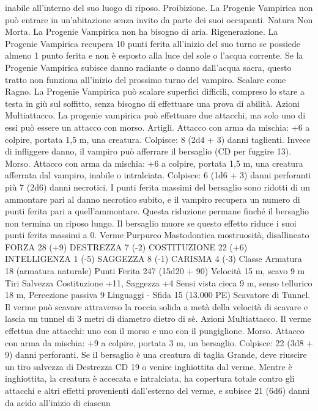 \begin{multicols}{2}
inabile all’interno del suo luogo di riposo.
Proibizione. La Progenie Vampirica non può entrare in
un’abitazione senza invito da parte dei suoi occupanti.
Natura Non Morta. La Progenie Vampirica non ha bisogno di
aria.
Rigenerazione. La Progenie Vampirica recupera 10 punti ferita
all’inizio del suo turno se possiede almeno 1 punto ferita e non è
esposto alla luce del sole o l’acqua corrente. Se la Progenie
Vampirica subisce danno radiante o danno dall’acqua sacra,
questo tratto non funziona all’inizio del prossimo turno del
vampiro.
Scalare come Ragno. La Progenie Vampirica può scalare
superfici difficili, compreso lo stare a testa in giù sul soffitto,
senza bisogno di effettuare una prova di abilità.
Azioni
Multiattacco. La progenie vampirica può effettuare due attacchi,
ma solo uno di essi può essere un attacco con morso.
Artigli. Attacco con arma da mischia: +6 a colpire, portata 1,5
m, una creatura.
Colpisce: 8 (2d4 + 3) danni taglienti. Invece di infliggere danno,
il vampiro può afferrare il bersaglio (CD per fuggire 13).
Morso. Attacco con arma da mischia: +6 a colpire, portata 1,5 m,
una creatura afferrata dal vampiro, inabile o intralciata.
Colpisce: 6 (1d6 + 3) danni perforanti più 7 (2d6) danni necrotici. I
punti ferita massimi del bersaglio sono ridotti di un ammontare pari
al danno necrotico subito, e il vampiro recupera un numero di punti
ferita pari a quell’ammontare. Questa riduzione permane finché il
bersaglio non termina un riposo lungo. Il bersaglio muore se questo
effetto riduce i suoi punti ferita massimi a 0.
Verme Purpureo
Mastodontica mostruosità, disallineato
FORZA 28 (+9)
DESTREZZA 7 (-2)
COSTITUZIONE 22 (+6)
INTELLIGENZA 1 (-5)
SAGGEZZA 8 (-1)
CARISMA 4 (-3)
Classe Armatura 18 (armatura naturale)
Punti Ferita 247 (15d20 + 90)
Velocità 15 m, scavo 9 m
Tiri Salvezza Costituzione +11, Saggezza +4
Sensi vista cieca 9 m, senso tellurico 18 m, Percezione passiva 9
Linguaggi -
Sfida 15 (13.000 PE)
Scavatore di Tunnel. Il verme può scavare attraverso la roccia
solida a metà della velocità di scavare e lascia un tunnel di 3
metri di diametro dietro di sè.
Azioni
Multiattacco. Il verme effettua due attacchi: uno con il morso e
uno con il pungiglione.
Morso. Attacco con arma da mischia: +9 a colpire, portata 3 m,
un bersaglio.
Colpisce: 22 (3d8 + 9) danni perforanti. Se il bersaglio è una
creatura di taglia Grande, deve riuscire un tiro salvezza di
Destrezza CD 19 o venire inghiottita dal verme. Mentre è
inghiottita, la creatura è accecata e intralciata, ha copertura totale
contro gli attacchi e altri effetti provenienti dall’esterno del
verme, e subisce 21 (6d6) danni da acido all’inizio di ciascun

\end{multicols}
